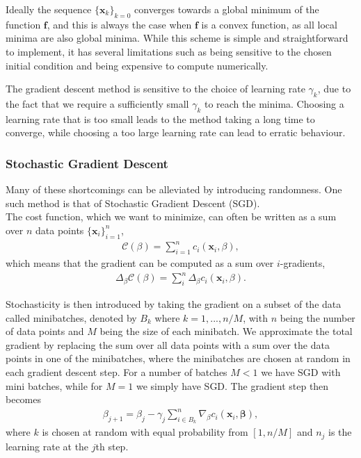 \documentclass[english,notitlepage,reprint,nofootinbib]{revtex4-2}  %
\begin{document}
Ideally the sequence $\{\boldsymbol{x}_k\}_{k=0}$ converges towards a global minimum of the function $\boldsymbol{f}$, and this is always the case when $\boldsymbol{f}$ is a convex function, as all local minima are also global minima. While this scheme is simple and straightforward to implement, it has several limitations such as being sensitive to the chosen initial condition and being expensive to compute numerically.

The gradient descent method is sensitive to the choice of learning rate $\gamma_k$, due to the fact that we require a sufficiently small $\gamma_k$ to reach the minima. Choosing a learning rate that is too small leads to the method taking a long time to converge, while choosing a too large learning rate can lead to erratic behaviour. 

\subsubsection*{Stochastic Gradient Descent}%
Many of these shortcomings can be alleviated by introducing randomness. One such method is that of Stochastic Gradient Descent (SGD). 
\vspace{3mm}
\\ 
The cost function, which we want to minimize, can often be written as a sum over $n$ data points $\{\boldsymbol{x}_i\}^n_{i=1}$, 
\begin{align}
    \mathcal{C}(\beta) = \sum\limits_{i=1}^n c_i (\boldsymbol{x}_i, \beta), \nonumber 
\end{align}
which means that the gradient can be computed as a sum over $i$-gradients, 
\begin{align}\label{eq: costfunc_SGD}
    \Delta_\beta \mathcal{C}(\beta) = \sum\limits_{i}^n \Delta_\beta c_i  (\boldsymbol{x}_i, \beta). 
\end{align}

Stochasticity is then introduced by taking the gradient on a subset of the data called minibatches, denoted by $B_k$ where $k=1, ..., n/M$, with $n$ being the number of data points and $M$ being the size of each minibatch. We approximate the total gradient by replacing the sum over all data points with a sum over the data points in one of the minibatches, 
where the minibatches are chosen at random in each gradient descent step. For a number of batches $M<1$ we have SGD with mini batches, while for $M=1$ we simply have SGD. 
The gradient step then becomes 
\begin{align}
    \beta_{j+1} 
    = \beta_j - \gamma_j \sum_{i \in B_k}^n \nabla_\beta c_i(\mathbf{x}_i,
    \mathbf{\beta}),  \nonumber
\end{align}
where $k$ is chosen at random with equal probability from $[1, n/M]$ and $n_j$ is the learning rate at the $j$th step. 
\end{document}
